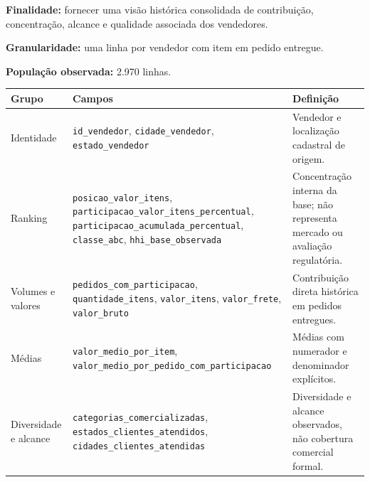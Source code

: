 \documentclass[12pt,a4paper]{article}
\newcounter{none}
\begin{document}
\textbf{Finalidade:} fornecer uma visão histórica consolidada de
contribuição, concentração, alcance e qualidade associada dos
vendedores.

\textbf{Granularidade:} uma linha por vendedor com item em pedido
entregue.

\textbf{População observada:} 2.970 linhas.

{\def\LTcaptype{none} %
\begin{longtable}[]{@{}
  >{\raggedright\arraybackslash}p{}
  >{\raggedright\arraybackslash}p{}
  >{\raggedright\arraybackslash}p{}@{}}
\toprule\noalign{}
\rowcolor{AzulCorporativo}
\begin{minipage}[b]{\linewidth}\raggedright\color{white}\bfseries
Grupo
\end{minipage} & \begin{minipage}[b]{\linewidth}\raggedright\color{white}\bfseries
Campos
\end{minipage} & \begin{minipage}[b]{\linewidth}\raggedright\color{white}\bfseries
Definição
\end{minipage} \\
\midrule\noalign{}
\endhead
\bottomrule\noalign{}
\endlastfoot
Identidade & \nolinkurl{id_vendedor}, \nolinkurl{cidade_vendedor},
\nolinkurl{estado_vendedor} & Vendedor e localização cadastral de
origem. \\
Ranking & \nolinkurl{posicao_valor_itens},
\nolinkurl{participacao_valor_itens_percentual},
\nolinkurl{participacao_acumulada_percentual}, \nolinkurl{classe_abc},
\nolinkurl{hhi_base_observada} & Concentração interna da base; não
representa mercado ou avaliação regulatória. \\
Volumes e valores & \nolinkurl{pedidos_com_participacao},
\nolinkurl{quantidade_itens}, \nolinkurl{valor_itens},
\nolinkurl{valor_frete}, \nolinkurl{valor_bruto} & Contribuição direta
histórica em pedidos entregues. \\
Médias & \nolinkurl{valor_medio_por_item},
\nolinkurl{valor_medio_por_pedido_com_participacao} & Médias com
numerador e denominador explícitos. \\
Diversidade e alcance & \nolinkurl{categorias_comercializadas},
\nolinkurl{estados_clientes_atendidos},
\nolinkurl{cidades_clientes_atendidas} & Diversidade e alcance
observados, não cobertura comercial formal. \\

\end{longtable}}
\end{document}
